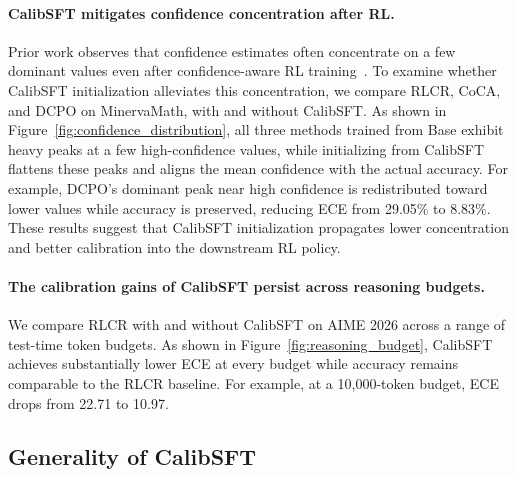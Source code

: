 \documentclass{article} %
\begin{document}
\paragraph{CalibSFT mitigates confidence concentration after RL.}
Prior work observes that confidence estimates often concentrate on a few dominant values even after confidence-aware RL training~\citep{wang2026process,yang2026scaling}. 
To examine whether CalibSFT initialization alleviates this concentration, we compare RLCR, CoCA, and DCPO on MinervaMath, with and without CalibSFT.
As shown in Figure~\ref{fig:confidence_distribution}, all three methods trained from Base exhibit heavy peaks at a few high-confidence values, while initializing from CalibSFT flattens these peaks and aligns the mean confidence with the actual accuracy.
For example, DCPO's dominant peak near high confidence is redistributed toward lower values while accuracy is preserved, reducing ECE from 29.05\% to 8.83\%.
These results suggest that CalibSFT initialization propagates lower concentration and better calibration into the downstream RL policy.












\paragraph{The calibration gains of CalibSFT persist across reasoning budgets.}
We compare RLCR with and without CalibSFT on AIME 2026 across a range of test-time token budgets.
As shown in Figure~\ref{fig:reasoning_budget}, CalibSFT achieves substantially lower ECE at every budget while accuracy remains comparable to the RLCR baseline. 
For example, at a 10{,}000-token budget, ECE drops from 22.71 to 10.97.


\subsection{Generality of CalibSFT}
\label{sec:generality} 
\end{document}

